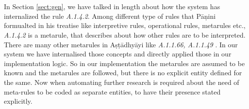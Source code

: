 \documentclass[a4paper,11pt,twoside,openright]{report}
\begin{document}
\\ \\
In Section \ref{sect:gen}, we have talked in length about how the system has internalized the rule \textsl{ A.1.4.2}. Among different type of rules that Pāṇini formualted in his treatise like interpretive rules, operational rules, metarules etc., \textsl{ A.1.4.2} is a metarule, that describes about how other rules are to be interpreted. There are many other metarules in Aṣṭādhyāyi like \textsl{ A.1.1.66, A.1.1.49 }. In our system we have internalised those concepts and directly applied those in our implementation logic. So in our implementation the metarules are assumed to be known and the metarules are followed, but there is no explicit entity defined for the same. Now when automating further research is required about the need of meta-rules to be coded as separate entities, to have their presence stated explicitly.
\end{document}
